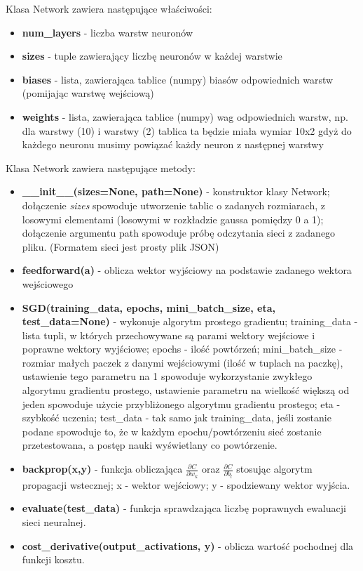 \documentclass{article}
\begin{document}
Klasa Network zawiera następujące właściwości:
\begin{itemize}
    \item \textbf{num\_layers} - liczba warstw neuronów
    \item \textbf{sizes} - tuple zawierający liczbę neuronów w każdej warstwie
    \item \textbf{biases} - lista, zawierająca tablice (numpy) biasów odpowiednich warstw (pomijając warstwę wejściową)
    \item \textbf{weights} - lista, zawierająca tablice (numpy) wag odpowiednich warstw, np. dla warstwy (10) i warstwy (2) tablica ta będzie miała wymiar 10x2 gdyż do każdego neuronu
    musimy powiązać każdy neuron z następnej warstwy
\end{itemize}

Klasa Network zawiera następujące metody:
\begin{itemize}
    \item \textbf{\_\_init\_\_(sizes=None, path=None)} - konstruktor klasy Network; dołączenie \textit{sizes} spowoduje utworzenie tablic o zadanych rozmiarach, z losowymi elementami (losowymi w rozkładzie gaussa pomiędzy 0 a 1);
    dołączenie argumentu path spowoduje próbę odczytania sieci z zadanego pliku. (Formatem sieci jest prosty plik JSON)
    \item \textbf{feedforward(a)} - oblicza wektor wyjściowy na podstawie zadanego wektora wejściowego
    \item \textbf{SGD(training\_data, epochs, mini\_batch\_size, eta, test\_data=None)} - wykonuje algorytm prostego gradientu; training\_data - lista tupli, w których przechowywane są parami wektory wejściowe i poprawne wektory wyjściowe;
    epochs - ilość powtórzeń; mini\_batch\_size - rozmiar małych paczek z danymi wejściowymi (ilość w tuplach na paczkę), ustawienie tego parametru na 1 spowoduje wykorzystanie zwykłego
    algorytmu gradientu prostego, ustawienie parametru na wielkość większą od jeden spowoduje użycie przybliżonego algorytmu gradientu prostego; eta - szybkość uczenia; test\_data - tak samo jak training\_data, jeśli zostanie podane
    spowoduje to, że w każdym epochu/powtórzeniu sieć zostanie przetestowana, a postęp nauki wyświetlany co powtórzenie.
    \item \textbf{backprop(x,y)} - funkcja obliczająca $\frac{\partial C}{\partial w_k}$ oraz $\frac{\partial C}{\partial b_l}$ stosując algorytm propagacji wstecznej; x - wektor wejściowy; y - spodziewany wektor wyjścia.
    \item \textbf{evaluate(test\_data)} - funkcja sprawdzająca liczbę poprawnych ewaluacji sieci neuralnej.
    \item \textbf{cost\_derivative(output\_activations, y)} - oblicza wartość pochodnej dla funkcji kosztu.
\end{itemize}
\end{document}
